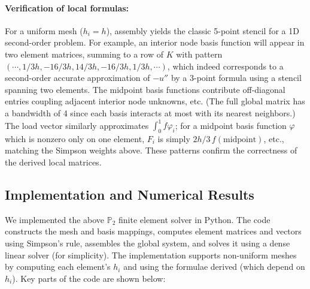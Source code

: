 \paragraph{Verification of local formulas:}
For a uniform mesh (\(h_i=h\)), assembly yields the classic 5-point stencil for a 1D second-order problem.
For example, an interior node basis function will appear in two element matrices, summing to a row of \(K\) with pattern \((\cdots, 1/3h, -16/3h, 14/3h, -16/3h, 1/3h,\cdots)\), which indeed corresponds to a second-order accurate approximation of \(-u''\) by a 3-point formula using a stencil spanning two elements.
The midpoint basis functions contribute off-diagonal entries coupling adjacent interior node unknowns, etc. (The full global matrix has a bandwidth of 4 since each basis interacts at most with its nearest neighbors.)
The load vector similarly approximates \(\int_0^1 f\varphi_i\); for a midpoint basis function \(\varphi\) which is nonzero only on one element, \(F_i\) is simply \(2h/3\,f(\text{midpoint})\), etc., matching the Simpson weights above.
These patterns confirm the correctness of the derived local matrices.


\subsection{Implementation and Numerical Results}

We implemented the above \(\mathbb{P}_2 \) finite element solver in Python.
The code constructs the mesh and basis mappings, computes element matrices and vectors using Simpson's rule, assembles the global system, and solves it using a dense linear solver (for simplicity).
The implementation supports non-uniform meshes by computing each element’s \(h_i\) and using the formulae derived (which depend on \(h_i\)).
Key parts of the code are shown below:

